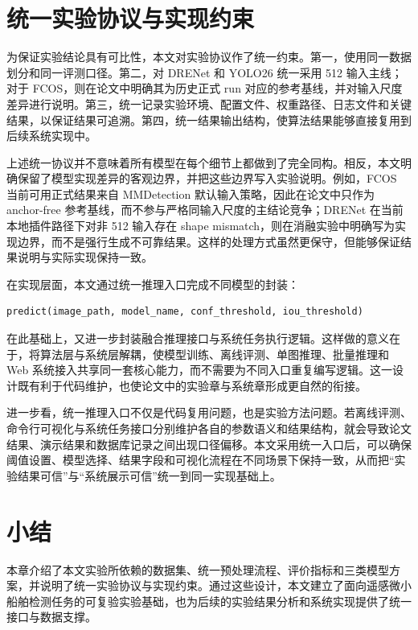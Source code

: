 \section{统一实验协议与实现约束}

为保证实验结论具有可比性，本文对实验协议作了统一约束。第一，使用同一数据划分和同一评测口径。第二，对 DRENet 和 YOLO26 统一采用 512 输入主线；对于 FCOS，则在论文中明确其为历史正式 run 对应的参考基线，并对输入尺度差异进行说明。第三，统一记录实验环境、配置文件、权重路径、日志文件和关键结果，以保证结果可追溯。第四，统一结果输出结构，使算法结果能够直接复用到后续系统实现中。

上述统一协议并不意味着所有模型在每个细节上都做到了完全同构。相反，本文明确保留了模型实现差异的客观边界，并把这些边界写入实验说明。例如，FCOS 当前可用正式结果来自 MMDetection 默认输入策略，因此在论文中只作为 anchor-free 参考基线，而不参与严格同输入尺度的主结论竞争；DRENet 在当前本地插件路径下对非 512 输入存在 shape mismatch，则在消融实验中明确写为实现边界，而不是强行生成不可靠结果。这样的处理方式虽然更保守，但能够保证结果说明与实际实现保持一致。

在实现层面，本文通过统一推理入口完成不同模型的封装：

\begin{verbatim}
predict(image_path, model_name, conf_threshold, iou_threshold)
\end{verbatim}

在此基础上，又进一步封装融合推理接口与系统任务执行逻辑。这样做的意义在于，将算法层与系统层解耦，使模型训练、离线评测、单图推理、批量推理和 Web 系统接入共享同一套核心能力，而不需要为不同入口重复编写逻辑。这一设计既有利于代码维护，也使论文中的实验章与系统章形成更自然的衔接。

进一步看，统一推理入口不仅是代码复用问题，也是实验方法问题。若离线评测、命令行可视化与系统任务接口分别维护各自的参数语义和结果结构，就会导致论文结果、演示结果和数据库记录之间出现口径偏移。本文采用统一入口后，可以确保阈值设置、模型选择、结果字段和可视化流程在不同场景下保持一致，从而把“实验结果可信”与“系统展示可信”统一到同一实现基础上。

\section{小结}

本章介绍了本文实验所依赖的数据集、统一预处理流程、评价指标和三类模型方案，并说明了统一实验协议与实现约束。通过这些设计，本文建立了面向遥感微小船舶检测任务的可复验实验基础，也为后续的实验结果分析和系统实现提供了统一接口与数据支撑。
